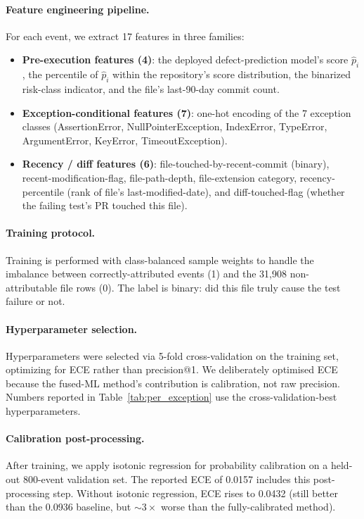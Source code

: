 \documentclass[11pt,a4paper]{article}
\begin{document}
\paragraph{Feature engineering pipeline.} For each event, we extract 17 features in three families:
\begin{itemize}
  \item \textbf{Pre-execution features (4)}: the deployed defect-prediction model's score $\hat{p}_i$, the percentile of $\hat{p}_i$ within the repository's score distribution, the binarized risk-class indicator, and the file's last-90-day commit count.
  \item \textbf{Exception-conditional features (7)}: one-hot encoding of the 7 exception classes (AssertionError, NullPointerException, IndexError, TypeError, ArgumentError, KeyError, TimeoutException).
  \item \textbf{Recency / diff features (6)}: file-touched-by-recent-commit (binary), recent-modification-flag, file-path-depth, file-extension category, recency-percentile (rank of file's last-modified-date), and diff-touched-flag (whether the failing test's PR touched this file).
\end{itemize}

\paragraph{Training protocol.} Training is performed with class-balanced sample weights to handle the imbalance between correctly-attributed events (1) and the 31{,}908 non-attributable file rows (0). The label is binary: did this file truly cause the test failure or not.

\paragraph{Hyperparameter selection.} Hyperparameters were selected via 5-fold cross-validation on the training set, optimizing for ECE rather than precision@1. We deliberately optimised ECE because the fused-ML method's contribution is calibration, not raw precision. Numbers reported in Table~\ref{tab:per_exception} use the cross-validation-best hyperparameters.

\paragraph{Calibration post-processing.} After training, we apply isotonic regression for probability calibration on a held-out 800-event validation set. The reported ECE of 0.0157 includes this post-processing step. Without isotonic regression, ECE rises to 0.0432 (still better than the 0.0936 baseline, but $\sim 3\times$ worse than the fully-calibrated method).
\end{document}
